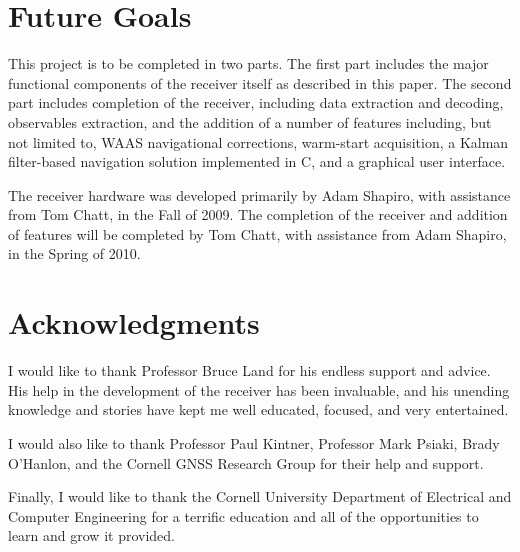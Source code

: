 \documentclass[12pt]{article}
\begin{document}
\section{Future Goals}
\label{sec:future goals}
This project is to be completed in two parts. The first part includes the major functional components of the receiver itself as described in this paper. The second part includes completion of the receiver, including data extraction and decoding, observables extraction, and the addition of a number of features including, but not limited to, WAAS navigational corrections, warm-start acquisition, a Kalman filter-based navigation solution implemented in C, and a graphical user interface.

The receiver hardware was developed primarily by Adam Shapiro, with assistance from Tom Chatt, in the Fall of 2009. The completion of the receiver and addition of features will be completed by Tom Chatt, with assistance from Adam Shapiro, in the Spring of 2010.

\section{Acknowledgments}
I would like to thank Professor Bruce Land for his endless support and advice. His help in the development of the receiver has been invaluable, and his unending knowledge and stories have kept me well educated, focused, and very entertained.

I would also like to thank Professor Paul Kintner, Professor Mark Psiaki, Brady O'Hanlon, and the Cornell GNSS Research Group for their help and support.

Finally, I would like to thank the Cornell University Department of Electrical and Computer Engineering for a terrific education and all of the opportunities to learn and grow it provided.



\nocite{misre}
\nocite{wakerly}
\end{document}

